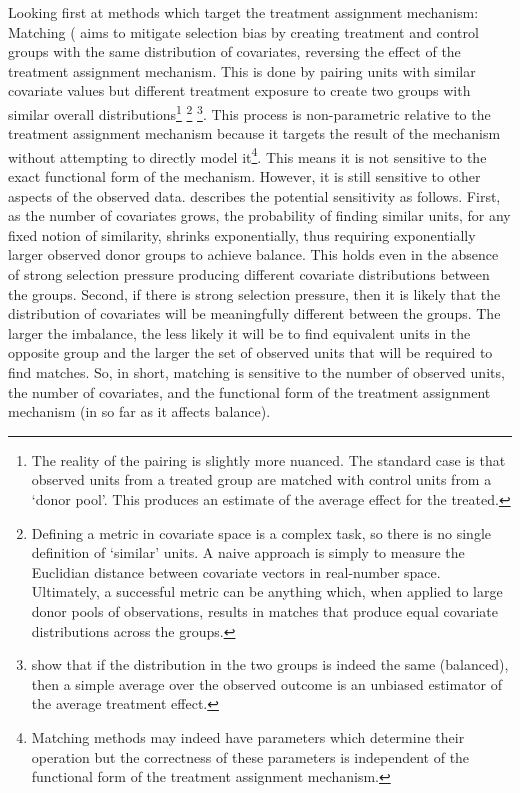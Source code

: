 \documentclass[../main.tex]{subfiles}
\begin{document}
\vspace{\baselineskip}
Looking first at methods which target the treatment assignment mechanism: Matching (\parencite{Rosenbaum1983TheEffects, Abadie2006LargeEffects} aims to mitigate selection bias by creating treatment and control groups with the same distribution of covariates, reversing the effect of the treatment assignment mechanism. This is done by pairing units with similar covariate values but different treatment exposure to create two groups with similar overall distributions\footnote{ The reality of the pairing is slightly more nuanced. The standard case is that observed units from a treated group are matched with control units from a ‘donor pool’. This produces an estimate of the average effect for the treated. } \footnote{ Defining a metric in covariate space is a complex task, so there is no single definition of ‘similar’ units. A naive approach is simply to measure the Euclidian distance between covariate vectors in real-number space. Ultimately, a successful metric can be anything which, when applied to large donor pools of observations, results in matches that produce equal covariate distributions across the groups. } \footnote{\textcite{Imai2008MisunderstandingsInference} show that if the distribution in the two groups is indeed the same (balanced), then a simple average over the observed outcome is an unbiased estimator of the average treatment effect. }. This process is non-parametric relative to the treatment assignment mechanism because it targets the result of the mechanism without attempting to directly model it\footnote{ Matching methods may indeed have parameters which determine their operation but the correctness of these parameters is independent of the functional form of the treatment assignment mechanism.  }. This means it is not sensitive to the exact functional form of the mechanism. However, it is still sensitive to other aspects of the observed data. \textcite{Broomberg2017DeepInference} describes the potential sensitivity as follows. First, as the number of covariates grows, the probability of finding similar units, for any fixed notion of similarity, shrinks exponentially, thus requiring exponentially larger observed donor groups to achieve balance. This holds even in the absence of strong selection pressure producing different covariate distributions between the groups. Second, if there is strong selection pressure, then it is likely that the distribution of covariates will be meaningfully different between the groups. The larger the imbalance, the less likely it will be to find equivalent units in the opposite group and the larger the set of observed units that will be required to find matches. So, in short, matching is sensitive to the number of observed units, the number of covariates, and the functional form of the treatment assignment mechanism (in so far as it affects balance).\par
\end{document}

